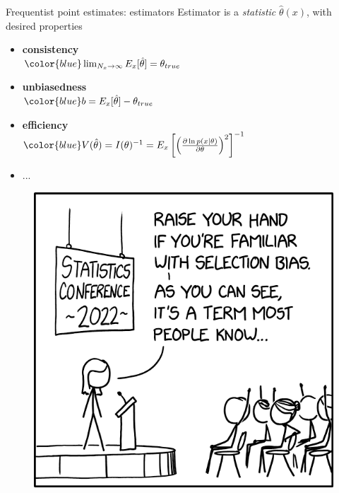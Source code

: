 \documentclass[
aspectratio=169,
14pt,
professionalfonts
]{beamer}
\begin{document}
\begin{frame}{Frequentist point estimates: estimators}
    Estimator is a \textit{statistic} $\hat \theta(x)$, with desired properties
    \begin{minipage}{0.65\textwidth}
        \begin{itemize}
            \item \textbf{consistency}\\
            $
            \color{blue}
            \lim_{N_x \to \infty} E_x[\hat \theta] = \theta_{true}
            $
            \item \textbf{unbiasedness}\\
            $
            \color{blue}
            b = E_x[\hat \theta] - \theta_{true}
            $
            
            \item \textbf{efficiency}\\
            $
            \color{blue}
            V(\hat \theta) = I(\theta)^{-1} = E_x\left[\left(\frac{\partial \ln p(x|\theta)}{\partial \theta}\right)^2\right]^{-1}
            $
            \item ...
        \end{itemize}
    \end{minipage}
    \begin{minipage}{0.34\textwidth}
        \begin{figure}
            \centering
            \href{https://xkcd.com/}{
            \includegraphics[width=\linewidth]{../plots/selection_bias_2x.png}
            }
        \end{figure}
    \end{minipage}
\end{frame}
\end{document}
